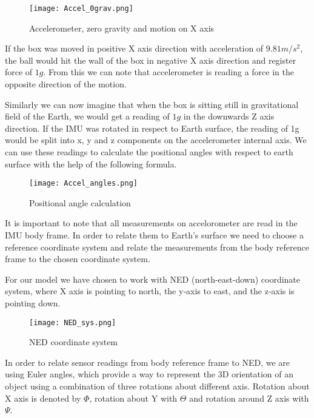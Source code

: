 \begin{figure}[H]
    \begin{center}
    \texttt{[image: Accel\_0grav.png]}
    \end{center}
    \caption{Accelerometer, zero gravity and motion on X axis }
    \label{fig:my_label}
\end{figure}

If the box was moved in positive X axis direction with acceleration of $9.81 m/s^2$, the ball would hit the wall of the box in negative X axis direction and register force of $1g$. From this we can note that accelerometer is reading a force in the opposite direction of the motion. 

Similarly we can now imagine that when the box is sitting still in gravitational field of the Earth, we would get a reading of $1g$ in the downwards Z axis direction. If the IMU was rotated in respect to Earth surface, the reading of 1g would be split into x, y and z components on the accelerometer internal axis. We can use these readings to calculate the positional angles with respect to earth surface with the help of the following formula.

\begin{figure}[H]
    \begin{center}
    \texttt{[image: Accel\_angles.png]}
    \end{center}
    \caption{Positional angle calculation   }
    \label{fig:my_label}
\end{figure}

It is important to note that all measurements on accelorometer are read in the IMU body frame. In order to relate them to Earth's surface we need to choose a reference coordinate system and relate the measurements from the body reference frame to the chosen coordinate system.

For our model we have chosen to work with NED (north-east-down) coordinate system, where X axis is pointing to north, the y‐axis to east, and the z‐axis is pointing down.

\begin{figure}[H]
    \begin{center}
    \texttt{[image: NED\_sys.png]}
    \end{center}
    \caption{NED coordinate system}
    \label{fig:my_label}
\end{figure}

In order to relate sensor readings from body reference frame to NED, we are using Euler angles, which provide a way to represent the 3D orientation of an object using a combination of three rotations about different axis. Rotation about X axis is denoted by $\Phi$, rotation about Y with $\Theta$ and rotation around Z axis with $\Psi$. 

